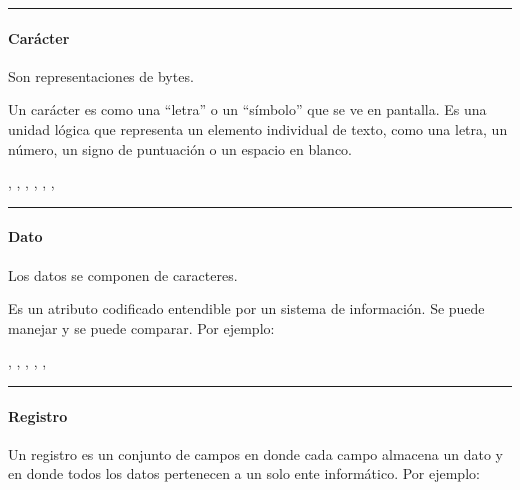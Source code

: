 \documentclass[letterpaper,10pt,spanish]{sphinxmanual}
\begin{document}
\bigskip\hrule\bigskip



\paragraph{Carácter}
\label{\detokenize{1_guias/8logica/G822:caracter}}
\sphinxAtStartPar
Son representaciones de bytes.

\sphinxAtStartPar
Un carácter es como una “letra” o un “símbolo” que se ve en pantalla. Es una unidad lógica que representa un elemento individual de texto, como una letra, un número, un signo de puntuación o un espacio en blanco.

\sphinxAtStartPar
{}, , \sphinxkeyboard{\sphinxupquote{\#}}, , , , \sphinxkeyboard{\sphinxupquote{\_}}


\bigskip\hrule\bigskip



\paragraph{Dato}
\label{\detokenize{1_guias/8logica/G822:dato}}
\sphinxAtStartPar
Los datos se componen de caracteres.

\sphinxAtStartPar
Es un atributo codificado entendible por un sistema de información. Se puede manejar y se puede comparar. Por ejemplo:

\sphinxAtStartPar
{}, , ,  , , 


\bigskip\hrule\bigskip



\paragraph{Registro}
\label{\detokenize{1_guias/8logica/G822:registro}}
\sphinxAtStartPar
Un registro es un conjunto de campos en donde cada campo almacena un dato y en donde todos los datos pertenecen a un solo ente informático. Por ejemplo:
\end{document}

